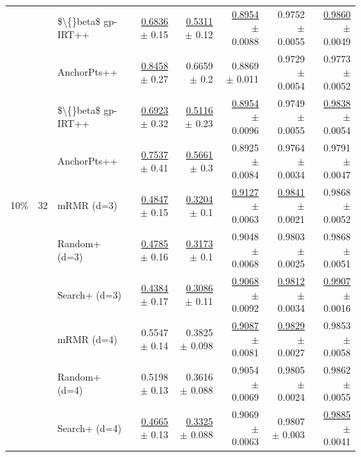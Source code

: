 \begin{longtable}{llp{}rrrrr}
 &  & \$\textbackslash\{\}beta\$ gp-IRT++ & \underline{0.6836} {\scriptsize $\pm$ 0.15} & \underline{0.5311} {\scriptsize $\pm$ 0.12} & \underline{0.8954} {\scriptsize $\pm$ 0.0088} & 0.9752 {\scriptsize $\pm$ 0.0055} & \underline{0.9860} {\scriptsize $\pm$ 0.0049} \\
 &  & AnchorPts++ & \underline{0.8458} {\scriptsize $\pm$ 0.27} & 0.6659 {\scriptsize $\pm$ 0.2} & 0.8869 {\scriptsize $\pm$ 0.011} & 0.9729 {\scriptsize $\pm$ 0.0054} & 0.9773 {\scriptsize $\pm$ 0.0052} \\
 &  & \$\textbackslash\{\}beta\$ gp-IRT++ & \underline{0.6923} {\scriptsize $\pm$ 0.32} & \underline{0.5116} {\scriptsize $\pm$ 0.23} & \underline{0.8954} {\scriptsize $\pm$ 0.0096} & 0.9749 {\scriptsize $\pm$ 0.0055} & \underline{0.9838} {\scriptsize $\pm$ 0.0054} \\
 &  & AnchorPts++ & \underline{0.7537} {\scriptsize $\pm$ 0.41} & \underline{0.5661} {\scriptsize $\pm$ 0.3} & 0.8925 {\scriptsize $\pm$ 0.0084} & 0.9764 {\scriptsize $\pm$ 0.0034} & 0.9791 {\scriptsize $\pm$ 0.0047} \\
\midrule
10\% & 32 & mRMR (d=3) & \underline{0.4847} {\scriptsize $\pm$ 0.15} & \underline{0.3204} {\scriptsize $\pm$ 0.1} & \underline{0.9127} {\scriptsize $\pm$ 0.0063} & \underline{0.9841} {\scriptsize $\pm$ 0.0021} & 0.9868 {\scriptsize $\pm$ 0.0052} \\
 &  & Random+ (d=3) & \underline{0.4785} {\scriptsize $\pm$ 0.16} & \underline{0.3173} {\scriptsize $\pm$ 0.1} & 0.9048 {\scriptsize $\pm$ 0.0068} & 0.9803 {\scriptsize $\pm$ 0.0025} & 0.9868 {\scriptsize $\pm$ 0.0051} \\
 &  & Search+ (d=3) & \underline{0.4384} {\scriptsize $\pm$ 0.17} & \underline{0.3086} {\scriptsize $\pm$ 0.11} & \underline{0.9068} {\scriptsize $\pm$ 0.0092} & \underline{0.9812} {\scriptsize $\pm$ 0.0034} & \underline{0.9907} {\scriptsize $\pm$ 0.0016} \\
 &  & mRMR (d=4) & 0.5547 {\scriptsize $\pm$ 0.14} & 0.3825 {\scriptsize $\pm$ 0.098} & \underline{0.9087} {\scriptsize $\pm$ 0.0081} & \underline{0.9829} {\scriptsize $\pm$ 0.0027} & 0.9853 {\scriptsize $\pm$ 0.0058} \\
 &  & Random+ (d=4) & 0.5198 {\scriptsize $\pm$ 0.13} & 0.3616 {\scriptsize $\pm$ 0.088} & 0.9054 {\scriptsize $\pm$ 0.0069} & 0.9805 {\scriptsize $\pm$ 0.0024} & 0.9862 {\scriptsize $\pm$ 0.0055} \\
 &  & Search+ (d=4) & \underline{0.4665} {\scriptsize $\pm$ 0.13} & \underline{0.3325} {\scriptsize $\pm$ 0.088} & 0.9069 {\scriptsize $\pm$ 0.0063} & 0.9807 {\scriptsize $\pm$ 0.003} & \underline{0.9885} {\scriptsize $\pm$ 0.0041} \\

\end{longtable}
